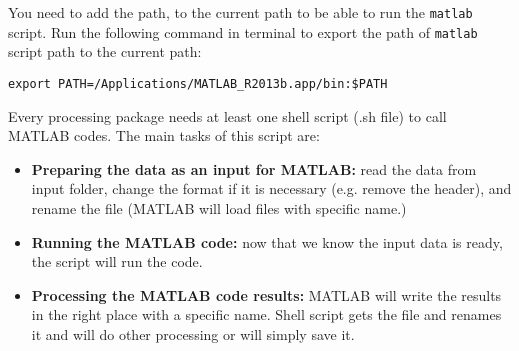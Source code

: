 \noindent
You need to add the path, to the current path to be able to run the \texttt{matlab} script. Run the following command in terminal to export the path of \texttt{matlab} script path to the current path:

\begin{mdframed}[hidealllines=true,backgroundcolor=gray!20]
\fontsize{10pt}{1pt}
\texttt{export PATH=/Applications/MATLAB\_R2013b.app/bin:\$PATH}
\end{mdframed}


\noindent
Every processing package needs at least one shell script (.sh file) to call MATLAB codes. The main tasks of this script are:

\begin{itemize} 
  \item   \textbf{Preparing the data as an input for MATLAB:} read the data from input folder, change the format if it is necessary (e.g. remove the header), and rename the file (MATLAB will load files with specific name.)
    \item \textbf{Running the MATLAB code:} now that we know the input data is ready, the script will run the code.
  \item  \textbf{Processing the MATLAB code results:} MATLAB will write the results in the right place with a specific name. Shell script gets the file and renames it and will do other processing or will simply save it.

\end{itemize}

